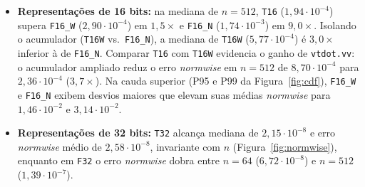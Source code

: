 \documentclass[journal]{IEEEtran}
\begin{document}
\begin{itemize}
\item \textbf{Representações de 16 bits:} na mediana de $n=512$, \texttt{T16}
($1{,}94\cdot 10^{-4}$) supera \texttt{F16\_W} ($2{,}90\cdot 10^{-4}$) em
$1{,}5\times$ e \texttt{F16\_N} ($1{,}74\cdot 10^{-3}$) em $9{,}0\times$.
Isolando o acumulador (\texttt{T16W} vs.\ \texttt{F16\_N}), a mediana de
\texttt{T16W} ($5{,}77\cdot 10^{-4}$) é $3{,}0\times$ inferior à de
\texttt{F16\_N}. Comparar \texttt{T16} com \texttt{T16W} evidencia o ganho de
\texttt{vtdot.vv}: o acumulador ampliado reduz o erro \emph{normwise} em
$n=512$ de $8{,}70\cdot 10^{-4}$ para $2{,}36\cdot 10^{-4}$ ($3{,}7\times$). Na
cauda superior (P95 e P99 da Figura~\ref{fig:cdf}), \texttt{F16\_W} e
\texttt{F16\_N} exibem desvios maiores que elevam suas médias \emph{normwise}
para $1{,}46\cdot 10^{-2}$ e $3{,}14\cdot 10^{-2}$.
\item \textbf{Representações de 32 bits:} \texttt{T32} alcança mediana de
$2{,}15\cdot 10^{-8}$ e erro \emph{normwise} médio de $2{,}58\cdot 10^{-8}$,
invariante com $n$ (Figura~\ref{fig:normwise}), enquanto em \texttt{F32} o erro
\emph{normwise} dobra entre $n=64$ ($6{,}72\cdot 10^{-8}$) e $n=512$
($1{,}39\cdot 10^{-7}$).
\end{itemize}
\end{document}
